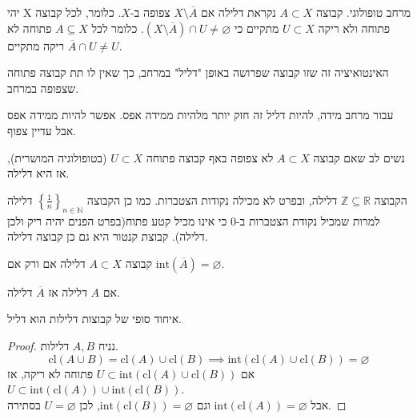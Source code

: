 \documentclass{tstextbook}
\begin{document}
\begin{definition}
יהי X מרחב טופולוגי. קבוצה \(A\subset X\) נקראת דלילה אם \(X\setminus\overline{A}\) צפופה ב-\(X\).
כלומר, לכל קבוצה פתוחה ולא ריקה \(U\subset X\) מתקיים כי \(\left( X\setminus\overline{A} \right)\cap U\ne\varnothing\). כלומר לכל \(A\subseteq X\) פתוחה לא ריקה מתקיים \(\overline{A}\cap U\neq U\).

\end{definition}
\begin{remark}
האינטואיציה זה שזו קבוצה שפרושה באופן "דליל" במרחב, כך שאין לו תת קבוצה פתוחה שצפופה במרחב.

\end{remark}
\begin{remark}
עבור מרחב מידה, להיות דליל זה חזק יותר מלהיות ממידה אפס. אפשר להיות ממידה אפס אבל עדיין צפוף.

\end{remark}
\begin{remark}
נשים לב שאם קבוצה \(A\subset X\) לא צפופה באף קבוצה פתוחה \(U\subset X\) (בטופולוגיה המושרית), אז היא דלילה.

\end{remark}
\begin{example}
הקבוצה \(\mathbb{Z}\subseteq \mathbb{R}\) דלילה, ובפרט לא מכילה נקודות הצטברות. כמו כן הקבוצה \(\left\{  \frac{1}{n}  \right\}_{n \in \mathbb{N}}\) דלילה למרות שמכיל נקודת הצטברות ב-\(0\) כי אינו מכיל קטע פתוח(בפרט הפנים יהיה ריק ולכן דלילה). קבוצת קנטור היא גם כן קבוצה דלילה.

\end{example}
\begin{proposition}
קבוצה \(A\subset X\) דלילה אם ורק אם \(\text{int}\left( \overline{A} \right)=\varnothing\).

\end{proposition}
\begin{corollary}
אם \(A\) דלילה אז \(\overline{A}\) דלילה.

\end{corollary}
\begin{proposition}
איחוד סופי של קבוצות דלילות הוא דליל.

\end{proposition}
\begin{proof}
נניח \(A,B\) דלילות.\\
$$\text{cl}\left( A\cup B \right)=\text{cl}(A)\cup \text{cl}(B)\implies \text{int}\left( \text{cl}(A)\cup \text{cl}(B) \right)=\varnothing$$
אם \(U\subset \text{int}\left( \text{cl}(A)\cup \text{cl}(B) \right)\) פתוחה לא ריקה, אז \(U\subset \text{int}\left( \text{cl}(A) \right)\cup \text{int}\left( \text{cl}(B) \right)\).\\

אבל \(\text{int}\left( \text{cl}(A) \right)=\varnothing\) וגם \(\text{int}\left( \text{cl}(B) \right)=\varnothing\), לכן \(U=\varnothing\) בסתירה.

\end{proof}
\end{document}
